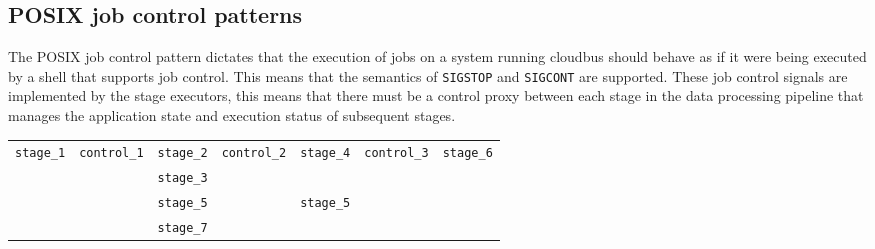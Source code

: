 \subsection{POSIX job control patterns}
The POSIX job control pattern dictates that the execution of jobs on a system running cloudbus should behave as if it were being %
executed by a shell that supports job control. This means that the semantics of \texttt{SIGSTOP} and \texttt{SIGCONT} are supported. These %
job control signals are implemented by the stage executors, this means that there must be a control proxy between each stage in the %
data processing pipeline that manages the application state and execution status of subsequent stages.
\begin{center}
	\begin{tabular}{c|c|c|c|c|c|c}
		\multirow{4}{*}{\texttt{stage\_1}} & 
		\multirow{4}{*}{\texttt{control\_1}} & \texttt{stage\_2}  & 
		\multirow{4}{*}{\texttt{control\_2}} & \multirow{2}{*}{\texttt{stage\_4}} & 
		\multirow{4}{*}{\texttt{control\_3}} & \multirow{4}{*}{\texttt{stage\_6}} \\
		& & \texttt{stage\_3} & &																		& &\\
		& &\texttt{stage\_5}  & &\multirow{2}{*}{\texttt{stage\_5}}	& &\\
		& &\texttt{stage\_7}  & &																		& &
	\end{tabular}
\end{center}